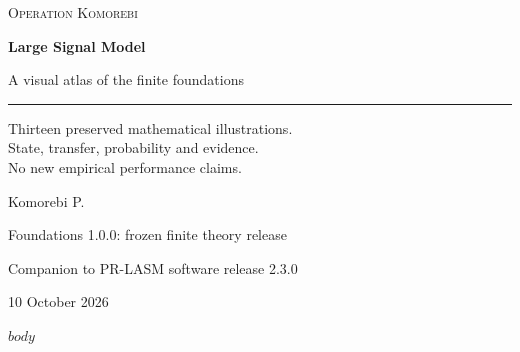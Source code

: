 \documentclass[11pt,letterpaper]{article}
\begin{document}
\hypersetup{pageanchor=false}
\begin{titlepage}
\vspace*{0.5in}
{\small\textsc{Operation Komorebi}\par}
\vspace{0.72in}
{\fontsize{33}{39}\selectfont\bfseries Large Signal Model\par}
\vspace{0.3in}
{\fontsize{21}{27}\selectfont A visual atlas of the finite foundations\par}
\vspace{0.45in}
\rule{\textwidth}{0.45pt}\par
\vspace{0.3in}
\begin{minipage}{0.95\textwidth}
\large
Thirteen preserved mathematical illustrations.\\State, transfer, probability and evidence.\\No new empirical performance claims.
\end{minipage}
\vfill
{\Large Komorebi P.\par}
\vspace{0.2in}
{\normalsize Foundations 1.0.0: frozen finite theory release\par}
{\normalsize Companion to PR-LASM software release 2.3.0\par}
{\normalsize 10 October 2026\par}
\end{titlepage}
\hypersetup{pageanchor=true}
$body$
\end{document}
